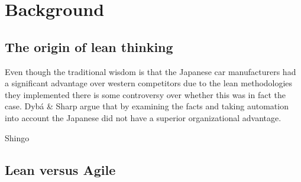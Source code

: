 
\chapter{Background}
\label{chapter:background}

\section{The origin of lean thinking}
\label{section:leanorigins}



Even though the traditional wisdom is that the Japanese car manufacturers had a significant advantage over western competitors due to the lean methodologies they implemented there is some controversy over whether this was in fact the case. Dybá \& Sharp argue that by examining the facts and taking automation into account the Japanese did not have a superior organizational advantage. \cite{Dyba2012WhatS}

Shingo \cite{Shingo1989Study}

\section{Lean versus Agile}
\label{section:leanvsagile}


